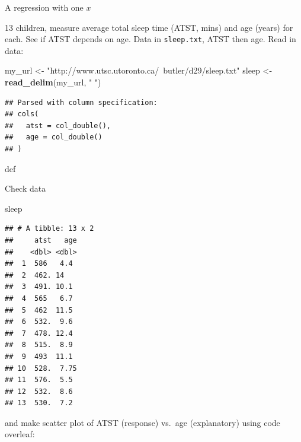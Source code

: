 \documentclass[ignorenonframetext,]{beamer}
\newenvironment{Shaded}{\begin{snugshade}}{\end{snugshade}}
\newcommand{\KeywordTok}[1]{\textcolor[rgb]{0.13,0.29,0.53}{\textbf{#1}}}
\newcommand{\NormalTok}[1]{#1}
\newcommand{\StringTok}[1]{\textcolor[rgb]{0.31,0.60,0.02}{#1}}
\begin{document}
\begin{frame}[fragile]{A regression with one \(x\)}
\protect\hypertarget{a-regression-with-one-x}{}

13 children, measure average total sleep time (ATST, mins) and age
(years) for each. See if ATST depends on age. Data in
\texttt{sleep.txt}, ATST then age. Read in data:

\begin{Shaded}
\begin{Highlighting}[]
\NormalTok{my_url <-}\StringTok{ "http://www.utsc.utoronto.ca/~butler/d29/sleep.txt"}
\NormalTok{sleep <-}\StringTok{ }\KeywordTok{read_delim}\NormalTok{(my_url, }\StringTok{" "}\NormalTok{)}
\end{Highlighting}
\end{Shaded}

\begin{verbatim}
## Parsed with column specification:
## cols(
##   atst = col_double(),
##   age = col_double()
## )
\end{verbatim}

def

\end{frame}

\begin{frame}[fragile]{Check data}
\protect\hypertarget{check-data}{}

\begin{Shaded}
\begin{Highlighting}[]
\NormalTok{sleep}
\end{Highlighting}
\end{Shaded}

\begin{verbatim}
## # A tibble: 13 x 2
##     atst   age
##    <dbl> <dbl>
##  1  586   4.4 
##  2  462. 14   
##  3  491. 10.1 
##  4  565   6.7 
##  5  462  11.5 
##  6  532.  9.6 
##  7  478. 12.4 
##  8  515.  8.9 
##  9  493  11.1 
## 10  528.  7.75
## 11  576.  5.5 
## 12  532.  8.6 
## 13  530.  7.2
\end{verbatim}

and make scatter plot of ATST (response) vs.~age (explanatory) using
code overleaf:

\end{frame}
\end{document}
